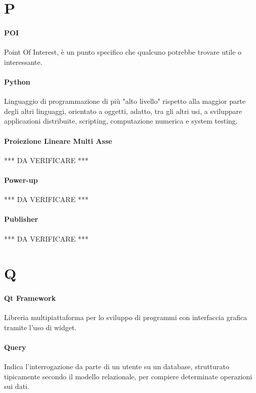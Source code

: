 \documentclass[]{article}
\begin{document}
	\newpage
	
	\section*{P}
	
	\paragraph*{POI}
	Point Of Interest, è un punto specifico che qualcuno potrebbe trovare utile o interessante.
	
	\paragraph*{Python}
	Linguaggio di programmazione di più "alto livello" rispetto alla maggior parte degli altri linguaggi, orientato a oggetti, adatto, tra gli altri usi, a sviluppare applicazioni distribuite, scripting, computazione numerica e system testing.
	
	\paragraph*{Proiezione Lineare Multi Asse}
	*** DA VERIFICARE ***
	
	\paragraph*{Power-up}
	*** DA VERIFICARE ***
	
	\paragraph*{Publisher}
	*** DA VERIFICARE ***
	
	\newpage
	
	\section*{Q}
	
	\paragraph*{Qt Framework}
	Libreria multipiattaforma per lo sviluppo di programmi con interfaccia grafica tramite l'uso di widget.
	
	\paragraph*{Query}
	Indica l'interrogazione da parte di un utente su un database, strutturato tipicamente secondo il modello relazionale, per compiere determinate operazioni sui dati.
	
\end{document}
